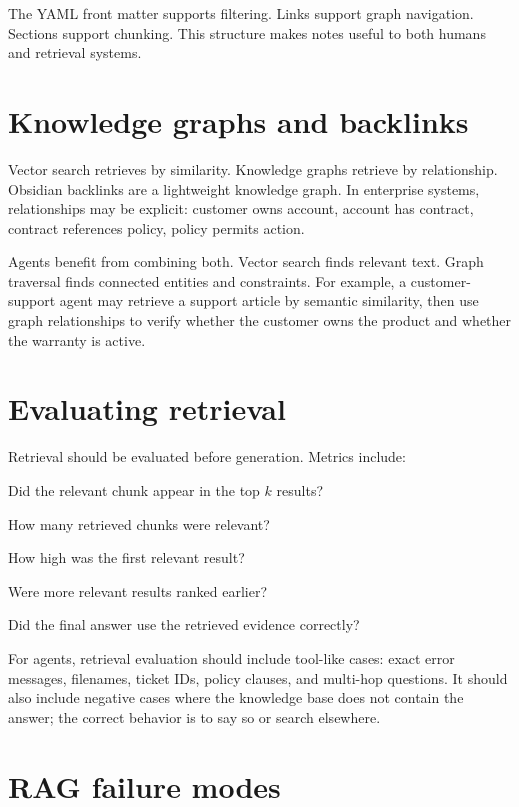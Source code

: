 The YAML front matter supports filtering. Links support graph navigation. Sections support chunking. This structure makes notes useful to both humans and retrieval systems.

\section{Knowledge graphs and backlinks}

Vector search retrieves by similarity. Knowledge graphs retrieve by relationship. Obsidian backlinks are a lightweight knowledge graph. In enterprise systems, relationships may be explicit: customer owns account, account has contract, contract references policy, policy permits action.

Agents benefit from combining both. Vector search finds relevant text. Graph traversal finds connected entities and constraints. For example, a customer-support agent may retrieve a support article by semantic similarity, then use graph relationships to verify whether the customer owns the product and whether the warranty is active.

\section{Evaluating retrieval}

Retrieval should be evaluated before generation. Metrics include:

\begin{description}[leftmargin=*]
  \item[Recall@k.] Did the relevant chunk appear in the top $k$ results?
  \item[Precision@k.] How many retrieved chunks were relevant?
  \item[Mean reciprocal rank.] How high was the first relevant result?
  \item[NDCG.] Were more relevant results ranked earlier?
  \item[Answer grounding.] Did the final answer use the retrieved evidence correctly?
\end{description}

For agents, retrieval evaluation should include tool-like cases: exact error messages, filenames, ticket IDs, policy clauses, and multi-hop questions. It should also include negative cases where the knowledge base does not contain the answer; the correct behavior is to say so or search elsewhere.

\section{RAG failure modes}

